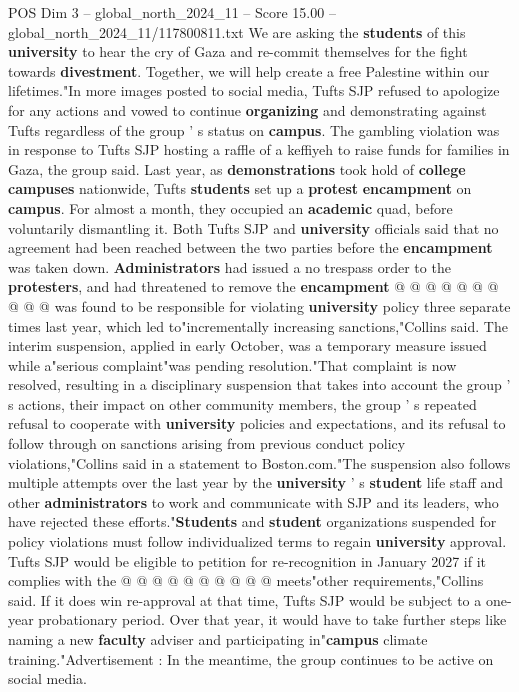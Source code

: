 \begin{textsample}{POS Dim 3 – global\_north\_2024\_11 – Score 15.00 – global\_north\_2024\_11/117800811.txt}
We are asking the \textbf{students} of this \textbf{university} to hear the cry of Gaza and re-commit themselves for the fight towards \textbf{divestment}.
Together, we will help create a free Palestine within our lifetimes."In more images posted to social media, Tufts SJP refused to apologize for any actions and vowed to continue \textbf{organizing} and demonstrating against Tufts regardless of the group ' s status on \textbf{campus}.
The gambling violation was in response to Tufts SJP hosting a raffle of a keffiyeh to raise funds for families in Gaza, the group said.
Last year, as \textbf{demonstrations} took hold of \textbf{college} \textbf{campuses} nationwide, Tufts \textbf{students} set up a \textbf{protest} \textbf{encampment} on \textbf{campus}.
For almost a month, they occupied an \textbf{academic} quad, before voluntarily dismantling it.
Both Tufts SJP and \textbf{university} officials said that no agreement had been reached between the two parties before the \textbf{encampment} was taken down. \textbf{Administrators} had issued a no trespass order to the \textbf{protesters}, and had threatened to remove the \textbf{encampment} @ @ @ @ @ @ @ @ @ @ was found to be responsible for violating \textbf{university} policy three separate times last year, which led to"incrementally increasing sanctions,"Collins said.
The interim suspension, applied in early October, was a temporary measure issued while a"serious complaint"was pending resolution."That complaint is now resolved, resulting in a disciplinary suspension that takes into account the group ' s actions, their impact on other community members, the group ' s repeated refusal to cooperate with \textbf{university} policies and expectations, and its refusal to follow through on sanctions arising from previous conduct policy violations,"Collins said in a statement to Boston.com."The suspension also follows multiple attempts over the last year by the \textbf{university} ' s \textbf{student} life staff and other \textbf{administrators} to work and communicate with SJP and its leaders, who have rejected these efforts."\textbf{Students} and \textbf{student} organizations suspended for policy violations must follow individualized terms to regain \textbf{university} approval.
Tufts SJP would be eligible to petition for re-recognition in January 2027 if it complies with the @ @ @ @ @ @ @ @ @ @ meets"other requirements,"Collins said.
If it does win re-approval at that time, Tufts SJP would be subject to a one-year probationary period.
Over that year, it would have to take further steps like naming a new \textbf{faculty} adviser and participating in"\textbf{campus} climate training."Advertisement : In the meantime, the group continues to be active on social media.

\end{textsample}
